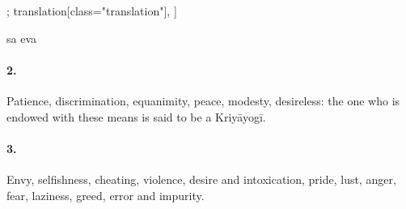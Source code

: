 \begin{alignment}[
    texts=edition[class="edition"];
    translation[class="translation"],
  ]
\begin{edition}
\begin{prose}
sa eva 
      \dd{}
    \end{prose}
    \ekdpb*{}
\end{edition}
\begin{translation}
\begin{tlate}
\paragraph{2.} Patience, discrimination, equanimity, peace, modesty, desireless: the one who is endowed with these means is said to be a Kriyāyogī. 
\paragraph{3.} Envy, selfishness, cheating, violence, desire and intoxication, pride, lust, anger, fear, laziness, greed, error and impurity. 

\end{tlate}
\end{translation}
\end{alignment}
